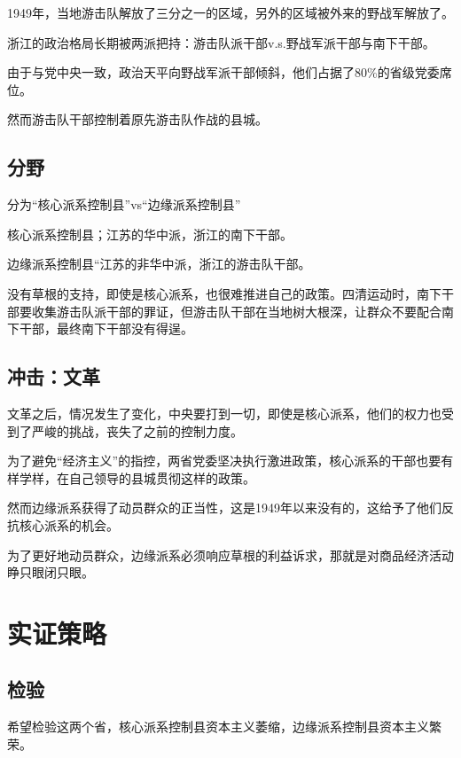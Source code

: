 \documentclass[
]{book}
\begin{document}
1949年，当地游击队解放了三分之一的区域，另外的区域被外来的野战军解放了。

浙江的政治格局长期被两派把持：游击队派干部v.s.野战军派干部与南下干部。

由于与党中央一致，政治天平向野战军派干部倾斜，他们占据了80\%的省级党委席位。

然而游击队干部控制着原先游击队作战的县城。

\hypertarget{ux5206ux91ce}{%
\section{分野}\label{ux5206ux91ce}}

分为``核心派系控制县''vs``边缘派系控制县''

核心派系控制县；江苏的华中派，浙江的南下干部。

边缘派系控制县``江苏的非华中派，浙江的游击队干部。

没有草根的支持，即使是核心派系，也很难推进自己的政策。四清运动时，南下干部要收集游击队派干部的罪证，但游击队干部在当地树大根深，让群众不要配合南下干部，最终南下干部没有得逞。

\hypertarget{ux51b2ux51fbux6587ux9769}{%
\section{冲击：文革}\label{ux51b2ux51fbux6587ux9769}}

文革之后，情况发生了变化，中央要打到一切，即使是核心派系，他们的权力也受到了严峻的挑战，丧失了之前的控制力度。

为了避免``经济主义''的指控，两省党委坚决执行激进政策，核心派系的干部也要有样学样，在自己领导的县城贯彻这样的政策。

然而边缘派系获得了动员群众的正当性，这是1949年以来没有的，这给予了他们反抗核心派系的机会。

为了更好地动员群众，边缘派系必须响应草根的利益诉求，那就是对商品经济活动睁只眼闭只眼。

\hypertarget{ux5b9eux8bc1ux7b56ux7565}{%
\chapter{实证策略}\label{ux5b9eux8bc1ux7b56ux7565}}

\hypertarget{ux68c0ux9a8c}{%
\section{检验}\label{ux68c0ux9a8c}}

希望检验这两个省，核心派系控制县资本主义萎缩，边缘派系控制县资本主义繁荣。
\end{document}
